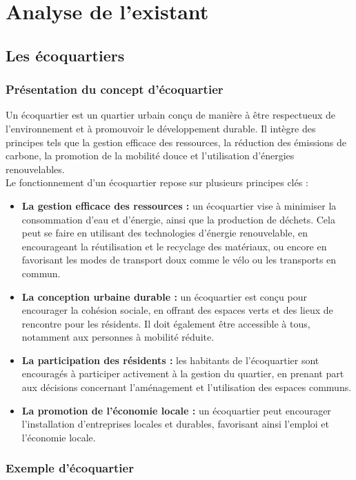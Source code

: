 \chapter{Analyse de l'existant}

\section{Les écoquartiers}

\subsection{Présentation du concept d'écoquartier}

Un écoquartier est un quartier urbain conçu de manière à être respectueux de l'environnement et à promouvoir le développement durable. Il intègre des principes tels que la gestion efficace des ressources, la réduction des émissions de carbone, la promotion de la mobilité douce et l'utilisation d'énergies renouvelables.\\

Le fonctionnement d'un écoquartier repose sur plusieurs principes clés :
\begin{itemize}
\item \textbf{La gestion efficace des ressources :} un écoquartier vise à minimiser la consommation d'eau et d'énergie, ainsi que la production de déchets. Cela peut se faire en utilisant des technologies d'énergie renouvelable, en encourageant la réutilisation et le recyclage des matériaux, ou encore en favorisant les modes de transport doux comme le vélo ou les transports en commun.
\item \textbf{La conception urbaine durable :} un écoquartier est conçu pour encourager la cohésion sociale, en offrant des espaces verts et des lieux de rencontre pour les résidents. Il doit également être accessible à tous, notamment aux personnes à mobilité réduite.
\item \textbf{La participation des résidents :} les habitants de l'écoquartier sont encouragés à participer activement à la gestion du quartier, en prenant part aux décisions concernant l'aménagement et l'utilisation des espaces communs.
\item \textbf{La promotion de l'économie locale :} un écoquartier peut encourager l'installation d'entreprises locales et durables, favorisant ainsi l'emploi et l'économie locale.
\end{itemize}


\subsection{Exemple d'écoquartier}


